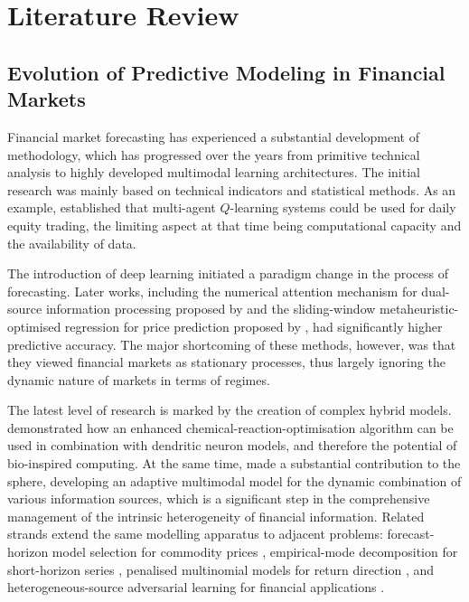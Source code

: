 \section{Literature Review}
\label{sec:lit}

\subsection{Evolution of Predictive Modeling in Financial Markets}

Financial market forecasting has experienced a substantial development of methodology,
which has progressed over the years from primitive technical analysis to highly developed
multimodal learning architectures. The initial research was mainly based on technical
indicators and statistical methods. As an example, \citet{lee07} established that
multi-agent $Q$-learning systems could be used for daily equity trading, the limiting
aspect at that time being computational capacity and the availability of data.

The introduction of deep learning initiated a paradigm change in the process of
forecasting. Later works, including the numerical attention mechanism for dual-source
information processing proposed by \citet{liu19} and the sliding-window
metaheuristic-optimised regression for price prediction proposed by \citet{chou18}, had
significantly higher predictive accuracy. The major shortcoming of these methods,
however, was that they viewed financial markets as stationary processes, thus largely
ignoring the dynamic nature of markets in terms of regimes.

The latest level of research is marked by the creation of complex hybrid models.
\citet{nayak22} demonstrated how an enhanced chemical-reaction-optimisation algorithm can
be used in combination with dendritic neuron models, and therefore the potential of
bio-inspired computing. At the same time, \citet{farimani24} made a substantial
contribution to the sphere, developing an adaptive multimodal model for the dynamic
combination of various information sources, which is a significant step in the
comprehensive management of the intrinsic heterogeneity of financial information.
Related strands extend the same modelling apparatus to adjacent problems: forecast-horizon
model selection for commodity prices \citep{zhang20}, empirical-mode decomposition for
short-horizon series \citep{yang20}, penalised multinomial models for return direction
\citep{hu24}, and heterogeneous-source adversarial learning for financial applications
\citep{khuwaja23}.

